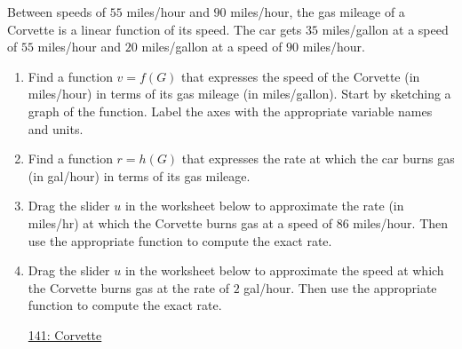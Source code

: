 \documentclass{ximera}
\begin{document}
\begin{question}  \label{Qeeetl4gg}
Between speeds of $55$ miles/hour and $90$ miles/hour, the gas mileage of a Corvette is a linear function of its speed. The car gets $35$ miles/gallon at a speed of $55$ miles/hour and $20$ miles/gallon at a speed of $90$ miles/hour.

\begin{enumerate}

\item Find a function $v=f(G)$ that expresses the speed of the Corvette (in miles/hour) in terms of its gas mileage (in miles/gallon). Start by sketching a graph of the function. Label the axes with the appropriate variable names and units.


\item Find a function $r=h(G)$ that expresses the rate at which the car burns gas (in gal/hour) in terms of its gas mileage. 

\item Drag the slider $u$ in the worksheet below to approximate the rate (in miles/hr) at which the Corvette burns gas at a speed of $86$ miles/hour. Then use the appropriate function to compute the exact rate.

\item Drag the slider $u$ in the worksheet below to approximate the speed at which the Corvette burns gas at the rate of $2$ gal/hour. Then use the appropriate function to compute the exact rate.


\begin{onlineOnly}
    \begin{center}
\end{center}
\end{onlineOnly}

\href{https://www.desmos.com/calculator/2fq4txcouq}{141: Corvette}


\end{enumerate}
\end{question}
\end{document}
